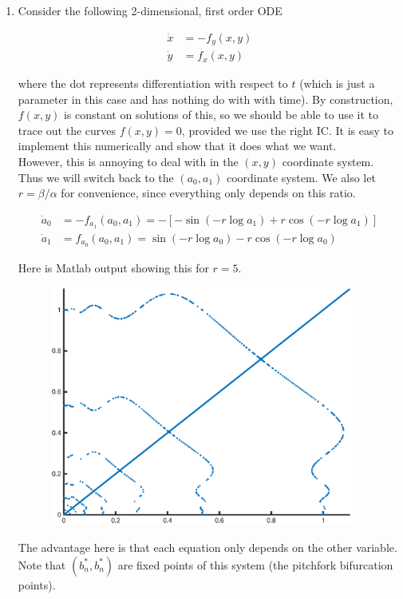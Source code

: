 \documentclass[12pt]{article}
\begin{document}
\begin{enumerate}
\item Consider the following 2-dimensional, first order ODE

\begin{align*}
\dot x &= -f_y(x,y)\\
\dot y &= f_x(x,y)
\end{align*}

where the dot represents differentiation with respect to $t$ (which is just a parameter in this case and has nothing do with with time). By construction, $f(x,y)$ is constant on solutions of this, so we should be able to use it to trace out the curves $f(x,y) = 0$, provided we use the right IC. It is easy to implement this numerically and show that it does what we want.\\

However, this is annoying to deal with in the $(x,y)$ coordinate system. Thus we will switch back to the $(a_0, a_1)$ coordinate system. We also let $r = \beta/ \alpha$ for convenience, since everything only depends on this ratio.

\begin{align}
\dot a_0 &= -f_{a_1}(a_0, a_1) = -[ -\sin(-r \log a_1) 
+ r \cos( -r \log a_1 ) ] \\
\dot a_1 &= f_{a_0}(a_0, a_1) = \sin(-r \log a_0) 
- r \cos( -r \log a_0 )
\end{align}

Here is Matlab output showing this for $r = 5$.

\begin{figure}[H]
\includegraphics[width=10cm]{zeroset5.eps}
\end{figure}


The advantage here is that each equation only depends on the other variable. Note that $(b^*_n, b^*_n)$ are fixed points of this system (the pitchfork bifurcation points).\\


\end{enumerate}
\end{document}

